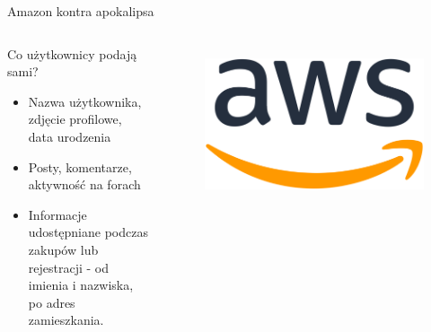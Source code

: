\begin{frame}[fragile]{Amazon kontra apokalipsa}
    \begin{columns}[c]
        \begin{block}{Co użytkownicy podają sami?}
          \begin{itemize}
            \item Nazwa użytkownika, zdjęcie profilowe, data urodzenia
            \item Posty, komentarze, aktywność na forach
            \item Informacje udostępniane podczas zakupów lub rejestracji - od imienia i nazwiska, po adres zamieszkania.%
          \end{itemize}
        \end{block}
        \begin{figure}
          \centering
          \includegraphics[height=0.45\textheight]{images/aws_logo.png}
          \label{fig:social-media}
        \end{figure}
    \end{columns}
\end{frame}
    
    